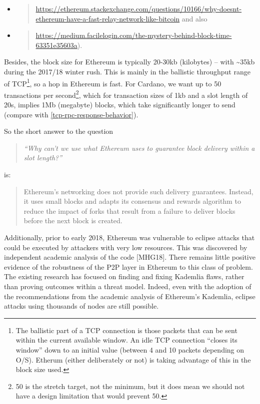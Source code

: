 \documentclass[11pt,a4paper]{article}
\begin{document}
\begin{itemize}
\item
  \begin{quote}
  \href{https://ethereum.stackexchange.com/questions/10166/why-doesnt-ethereum-have-a-fast-relay-network-like-bitcoin}{{https://ethereum.stackexchange.com/questions/10166/why-doesnt-ethereum-have-a-fast-relay-network-like-bitcoin}}
  and also
  \end{quote}
\item
  \begin{quote}
  \href{https://medium.facilelogin.com/the-mystery-behind-block-time-63351e35603a}{{https://medium.facilelogin.com/the-mystery-behind-block-time-63351e35603a}}).
  \end{quote}
\end{itemize}

Besides, the block size for Ethereum is typically 20-30kb (kilobytes) --
with \textasciitilde{}35kb during the 2017/18 winter rush. This is
mainly in the ballistic throughput range of TCP\footnote{The ballistic
  part of a TCP connection is those packets that can be sent within the
  current available window. An idle TCP connection ``closes its window''
  down to an initial value (between 4 and 10 packets depending on O/S).
  Etherum (either deliberately or not) is taking advantage of this in
  the block size used.}, so a hop in Ethereum is fast. For Cardano, we
want up to 50 transactions per second\footnote{50 is the stretch target,
  not the minimum, but it does mean we should not have a design
  limitation that would prevent 50.}, which for transaction sizes of 1kb
and a slot length of 20s, implies 1Mb (megabyte) blocks, which take
significantly longer to send (compare with \cref{tcp-rpc-response-behavior}).

So the short answer to the question

\begin{quote}
\emph{``Why can't we use what Ethereum uses to guarantee block delivery
within a slot length?'' }
\end{quote}

is:

\begin{quote}
Ethereum's networking does not provide such delivery guarantees.
Instead, it uses small blocks and adapts its consensus and rewards
algorithm to reduce the impact of forks that result from a failure to
deliver blocks before the next block is created.
\end{quote}

Additionally, prior to early 2018, Ethereum was vulnerable to eclipse
attacks that could be executed by attackers with very low resources.
This was discovered by independent academic analysis of the code
{[}MHG18{]}. There remains little positive evidence of the robustness of
the P2P layer in Ethereum to this class of problem. The existing
research has focused on finding and fixing Kademlia flaws, rather than
proving outcomes within a threat model. Indeed, even with the adoption
of the recommendations from the academic analysis of Ethereum's
Kademlia, eclipse attacks using thousands of nodes are still possible.
\end{document}
